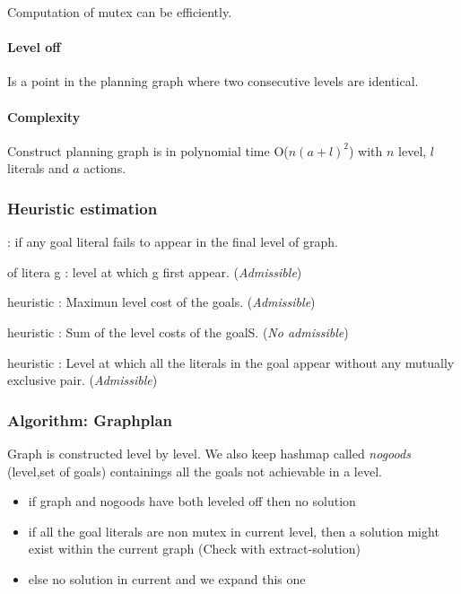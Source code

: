 Computation of mutex can be efficiently.

\paragraph{Level off}
Is a point in the planning graph where two consecutive levels are identical.

\paragraph{Complexity}
Construct planning  graph is in  polynomial time O($n(a+l)^2$)  with $n$
level, $l$ literals and $a$ actions.

\subsubsection{Heuristic estimation}
\begin{description}
    \item[Unsolvable] : if any goal literal fails to appear in the final level of graph.
    \item[Level-cost] of litera g : level at which g first appear.
        (\textit{Admissible})
    \item
    \item[Max-level] heuristic : Maximun level cost of the goals. (\textit{Admissible})
    \item[Level sum] heuristic : Sum of the level costs of the goalS. (\textit{No admissible})
    \item[Set-level] heuristic : Level at which all the literals in the goal appear
        without any mutually exclusive pair. (\textit{Admissible})
\end{description}

\subsubsection{Algorithm: Graphplan}
Graph is constructed level by level. We also keep hashmap called \textit{nogoods} (level,set of goals) containings all the goals not achievable in a level.
\begin{itemize}
    \item if graph and nogoods have both leveled off then no solution
    \item if all the goal literals are non mutex in
     current level, then a solution might exist within the current graph 
     (Check with extract-solution)
    \item else no solution in current and we expand this one
\end{itemize}


